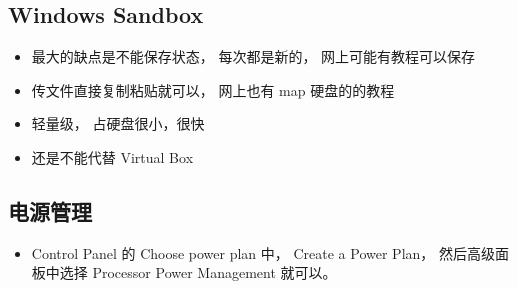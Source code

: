 \subsection{Windows Sandbox}
\begin{itemize}
\item 最大的缺点是不能保存状态， 每次都是新的， 网上可能有教程可以保存
\item 传文件直接复制粘贴就可以， 网上也有 map 硬盘的的教程
\item 轻量级， 占硬盘很小，很快
\item 还是不能代替 Virtual Box
\end{itemize}

\subsection{电源管理}
\begin{itemize}
\item Control Panel 的 Choose power plan 中， Create a Power Plan， 然后高级面板中选择 Processor Power Management 就可以。
\end{itemize}
